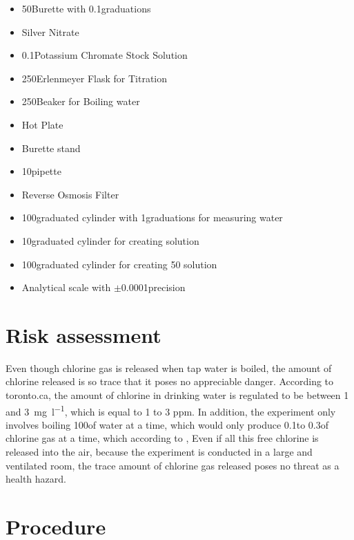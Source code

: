 \documentclass[12pt, demo]{article}
\begin{document}
\begin{itemize}
	\item 50\ml Burette with 0.1\ml graduations
	\item Silver Nitrate
	\item 0.1\mpl Potassium Chromate Stock Solution
	\item 250\ml Erlenmeyer Flask for Titration
	\item 250\ml Beaker for Boiling water
	\item Hot Plate
	\item Burette stand
	\item 10\ml pipette
	\item Reverse Osmosis Filter
	\item 100\ml graduated cylinder with 1\ml graduations for measuring water
	\item 10\ml graduated cylinder for creating  solution
	\item 100\ml graduated cylinder for creating 50\ml {} solution
	\item Analytical scale with $\pm$0.0001\gram precision
\end{itemize}

\section*{Risk assessment}

Even though chlorine gas is released when tap water is boiled, the amount of chlorine released is so trace that it poses no appreciable danger. According to toronto.ca, the amount of chlorine in drinking water is regulated to be between 1 and \SI{3}{\mg\per\litre}, which is equal to 1 to 3 ppm. In addition, the experiment only involves boiling 100\ml of water at a time, which would only produce 0.1\mg to 0.3\mg of chlorine gas at a time, which according to ,
Even if all this free chlorine is released into the air, because the experiment is conducted in a large and ventilated room, the trace amount of chlorine gas released poses no threat as a health hazard.

\section*{Procedure}
\end{document}
